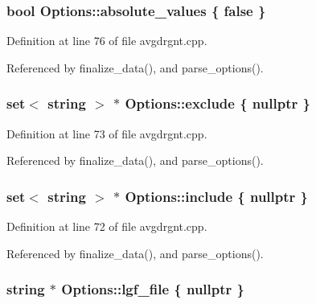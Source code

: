 \subsubsection[{\texorpdfstring{absolute\+\_\+values}{absolute_values}}]{\setlength{\rightskip}{0pt plus 5cm}bool Options\+::absolute\+\_\+values \{ false \}}\hypertarget{structOptions_a86e7be53c40b22db67261e2c34282736}{}\label{structOptions_a86e7be53c40b22db67261e2c34282736}


Definition at line 76 of file avgdrgnt.\+cpp.



Referenced by finalize\+\_\+data(), and parse\+\_\+options().

\subsubsection[{\texorpdfstring{exclude}{exclude}}]{\setlength{\rightskip}{0pt plus 5cm}set$<$ string $>$ $\ast$ Options\+::exclude \{ nullptr \}}\hypertarget{structOptions_a0b4e7353a06f655fb83a2402ed52ecd0}{}\label{structOptions_a0b4e7353a06f655fb83a2402ed52ecd0}


Definition at line 73 of file avgdrgnt.\+cpp.



Referenced by finalize\+\_\+data(), and parse\+\_\+options().

\subsubsection[{\texorpdfstring{include}{include}}]{\setlength{\rightskip}{0pt plus 5cm}set$<$ string $>$ $\ast$ Options\+::include \{ nullptr \}}\hypertarget{structOptions_a90ea5ea52a8010baead4fa1c9b587b6f}{}\label{structOptions_a90ea5ea52a8010baead4fa1c9b587b6f}


Definition at line 72 of file avgdrgnt.\+cpp.



Referenced by finalize\+\_\+data(), and parse\+\_\+options().

\subsubsection[{\texorpdfstring{lgf\+\_\+file}{lgf_file}}]{\setlength{\rightskip}{0pt plus 5cm}string $\ast$ Options\+::lgf\+\_\+file \{ nullptr \}}\hypertarget{structOptions_ab1d4dd586f45745c976ef7fcd2536221}{}\label{structOptions_ab1d4dd586f45745c976ef7fcd2536221}


